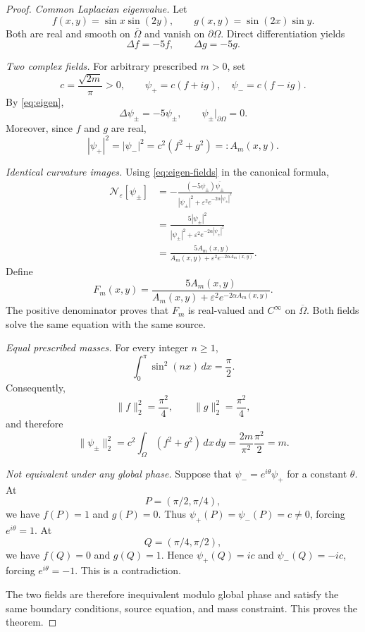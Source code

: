 \documentclass[11pt]{article}
\theoremstyle{remark}
\newcommand{\Ncurv}{\mathcal{N}_{\varepsilon}}
\begin{document}
\begin{proof}
\emph{Common Laplacian eigenvalue.}
Let
\[
f(x,y)=\sin x\sin(2y),\qquad
 g(x,y)=\sin(2x)\sin y.
\]
Both are real and smooth on $\overline\Omega$ and vanish on
$\partial\Omega$. Direct differentiation yields
\begin{equation}\label{eq:eigen}
\Delta f=-5f,\qquad\Delta g=-5g.
\end{equation}

\emph{Two complex fields.}
For arbitrary prescribed $m>0$, set
\[
c=\frac{\sqrt{2m}}{\pi}>0,
\qquad
\psi_+=c(f+ig),\quad
\psi_-=c(f-ig).
\]
By \eqref{eq:eigen},
\begin{equation}\label{eq:eigen-fields}
\Delta\psi_\pm=-5\psi_\pm,
\qquad\psi_\pm|_{\partial\Omega}=0.
\end{equation}
Moreover, since $f$ and $g$ are real,
\begin{equation}\label{eq:amplitude}
|\psi_+|^2=|\psi_-|^2
=c^2(f^2+g^2)=:A_m(x,y).
\end{equation}

\emph{Identical curvature images.}
Using \eqref{eq:eigen-fields} in the canonical formula,
\begin{align*}
\Ncurv[\psi_\pm]
&=-\frac{(-5\psi_\pm)\overline{\psi_\pm}}
{|\psi_\pm|^2+\varepsilon^2e^{-2\alpha|\psi_\pm|^2}}\\
&=\frac{5|\psi_\pm|^2}
{|\psi_\pm|^2+\varepsilon^2e^{-2\alpha|\psi_\pm|^2}}\\
&=\frac{5A_m(x,y)}{A_m(x,y)+\varepsilon^2e^{-2\alpha A_m(x,y)}}.
\end{align*}
Define
\begin{equation}\label{eq:force}
\boxed{\quad
F_m(x,y)=\frac{5A_m(x,y)}
{A_m(x,y)+\varepsilon^2e^{-2\alpha A_m(x,y)}}.
\quad}
\end{equation}
The positive denominator proves that $F_m$ is real-valued and
$C^\infty$ on $\overline\Omega$. Both fields solve the same equation
with the same source.

\emph{Equal prescribed masses.}
For every integer $n\geq1$,
\[
\int_0^\pi\sin^2(nx)\,dx=\frac\pi2.
\]
Consequently,
\[
\|f\|_2^2=\frac{\pi^2}{4},\qquad
\|g\|_2^2=\frac{\pi^2}{4},
\]
and therefore
\begin{equation}\label{eq:mass}
\|\psi_\pm\|_2^2
=c^2\int_\Omega(f^2+g^2)\,dx\,dy
=\frac{2m}{\pi^2}\frac{\pi^2}{2}=m.
\end{equation}

\emph{Not equivalent under any global phase.}
Suppose that $\psi_-=e^{i\theta}\psi_+$ for a constant $\theta$.
At
\[
P=(\pi/2,\pi/4),
\]
we have $f(P)=1$ and $g(P)=0$. Thus
$\psi_+(P)=\psi_-(P)=c\neq0$, forcing $e^{i\theta}=1$.
At
\[
Q=(\pi/4,\pi/2),
\]
we have $f(Q)=0$ and $g(Q)=1$. Hence
$\psi_+(Q)=ic$ and $\psi_-(Q)=-ic$, forcing
$e^{i\theta}=-1$. This is a contradiction.

The two fields are therefore inequivalent modulo global phase and
satisfy the same boundary conditions, source equation, and mass
constraint. This proves the theorem.
\end{proof}
\end{document}
